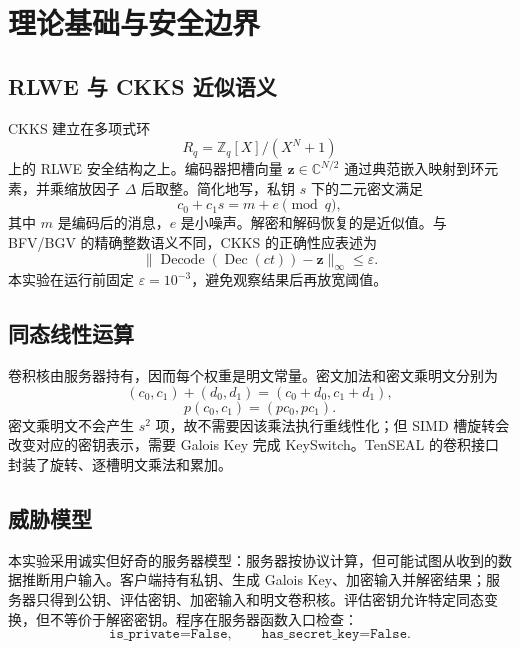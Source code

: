 \documentclass[UTF8,a4paper,zihao=-4]{ctexart}
\begin{document}
\section{理论基础与安全边界}

\subsection{RLWE 与 CKKS 近似语义}

CKKS 建立在多项式环
\[
  R_q=\mathbb{Z}_q[X]/(X^N+1)
\]
上的 RLWE 安全结构之上。编码器把槽向量 $\boldsymbol{z}\in\mathbb{C}^{N/2}$ 通过典范嵌入映射到环元素，并乘缩放因子 $\Delta$ 后取整。简化地写，私钥 $s$ 下的二元密文满足
\[
  c_0+c_1s=m+e\pmod q,
\]
其中 $m$ 是编码后的消息，$e$ 是小噪声。解密和解码恢复的是近似值。与 BFV/BGV 的精确整数语义不同，CKKS 的正确性应表述为
\[
  \lVert \operatorname{Decode}(\operatorname{Dec}(ct))-\boldsymbol{z}\rVert_\infty\le\varepsilon.
\]
本实验在运行前固定 $\varepsilon=10^{-3}$，避免观察结果后再放宽阈值。

\subsection{同态线性运算}

卷积核由服务器持有，因而每个权重是明文常量。密文加法和密文乘明文分别为
\[
  (c_0,c_1)+(d_0,d_1)=(c_0+d_0,c_1+d_1),
\]
\[
  p(c_0,c_1)=(pc_0,pc_1).
\]
密文乘明文不会产生 $s^2$ 项，故不需要因该乘法执行重线性化；但 SIMD 槽旋转会改变对应的密钥表示，需要 Galois Key 完成 KeySwitch。TenSEAL 的卷积接口封装了旋转、逐槽明文乘法和累加。

\subsection{威胁模型}

本实验采用诚实但好奇的服务器模型：服务器按协议计算，但可能试图从收到的数据推断用户输入。客户端持有私钥、生成 Galois Key、加密输入并解密结果；服务器只得到公钥、评估密钥、加密输入和明文卷积核。评估密钥允许特定同态变换，但不等价于解密密钥。程序在服务器函数入口检查：
\[
  \texttt{is\_private=False},\qquad \texttt{has\_secret\_key=False}.
\]
\end{document}
